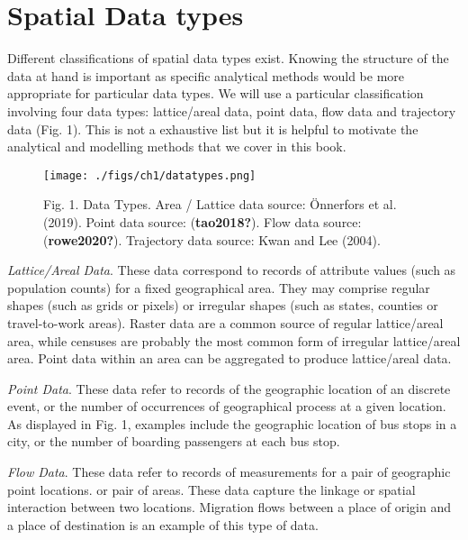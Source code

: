 \documentclass[
  letterpaper,
  krantz2]{style/krantz}
\begin{document}
\hypertarget{spatial-data-types}{%
\section{Spatial Data types}\label{spatial-data-types}}

Different classifications of spatial data types exist. Knowing the
structure of the data at hand is important as specific analytical
methods would be more appropriate for particular data types. We will use
a particular classification involving four data types: lattice/areal
data, point data, flow data and trajectory data (Fig. 1). This is not a
exhaustive list but it is helpful to motivate the analytical and
modelling methods that we cover in this book.

\begin{figure}

{\centering \texttt{[image: ./figs/ch1/datatypes.png]}

}

\caption{Fig. 1. Data Types. Area / Lattice data source: Önnerfors et
al. (2019). Point data source: (\textbf{tao2018?}). Flow data source:
(\textbf{rowe2020?}). Trajectory data source: Kwan and Lee (2004).}

\end{figure}

\emph{Lattice/Areal Data}. These data correspond to records of attribute
values (such as population counts) for a fixed geographical area. They
may comprise regular shapes (such as grids or pixels) or irregular
shapes (such as states, counties or travel-to-work areas). Raster data
are a common source of regular lattice/areal area, while censuses are
probably the most common form of irregular lattice/areal area. Point
data within an area can be aggregated to produce lattice/areal data.

\emph{Point Data}. These data refer to records of the geographic
location of an discrete event, or the number of occurrences of
geographical process at a given location. As displayed in Fig. 1,
examples include the geographic location of bus stops in a city, or the
number of boarding passengers at each bus stop.

\emph{Flow Data}. These data refer to records of measurements for a pair
of geographic point locations. or pair of areas. These data capture the
linkage or spatial interaction between two locations. Migration flows
between a place of origin and a place of destination is an example of
this type of data.
\end{document}
